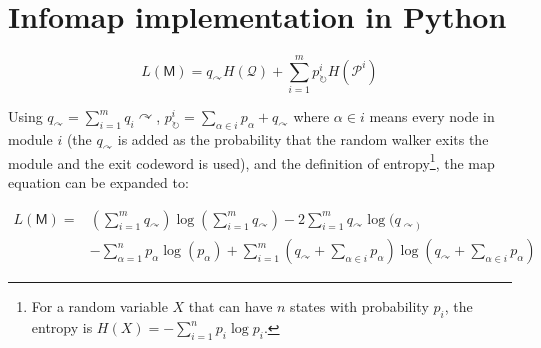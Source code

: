 \hypertarget{pyinfomap}{\section{Infomap implementation in
Python}\label{pyinfomap}}


\protect\hyperlink{pyinfomap}{}

\[L(\mathsf{M}) = q_{\curvearrowright} H(\mathcal{Q}) + \sum_{i=1}^{m}{p_{\circlearrowright}^{i} H(\mathcal{P}^i)}\]

Using \(q_{\curvearrowright} = \sum_{i=1}^{m}{q_{i}\curvearrowright}\),
\(p_{\circlearrowright}^{i} = \sum_{\alpha \in i}{p_{\alpha}} + q_{\curvearrowright}\)
where \(\alpha \in i\) means every node in module \(i\) (the
\(q_{\curvearrowright}\) is added as the probability that the random
walker exits the module and the exit codeword is used), and the
definition of entropy\footnote{For a random variable \(X\) that can have
  \(n\) states with probability \(p_i\), the entropy is
  \(H(X) = -\sum_{i=1}^{n}{p_i\log{p_i}}\).}, the map equation can be
expanded to:

\[
\begin{aligned}
L(\mathsf{M}) = &\left(\sum_{i=1}^{m}{q_{\curvearrowright}}\right) 
                                        \log \left(\sum_{i=1}^{m}{q_{\curvearrowright}}\right)
                                        - 2 \sum_{i=1}^{m}{q_{\curvearrowright}} \log (q_{\curvearrowright)} \\
                                &- \sum_{\alpha=1}^{n}{p_{\alpha} \log(p_\alpha)}
                                        + \sum_{i=1}^{m}{\left(q_{\curvearrowright} + \sum_{\alpha \in i}{p_{\alpha}}\right) \log \left(q_{\curvearrowright} + \sum_{\alpha \in i}{p_{\alpha}}\right)}
\end{aligned}
\]
